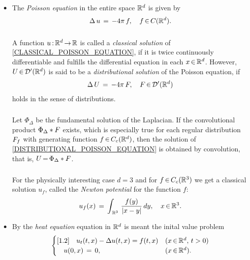 \documentclass[11pt,twoside]{article}
\begin{document}
\begin{itemize}[leftmargin=4mm]
\item[1.]
The \textit{Poisson equation} in the entire space ${\mathbb{R}}^d$ is given by
\begin{equation}\label{CLASSICAL_POISSON_EQUATION}
\Delta \, u \,=\, - 4\pi \,f, \quad f {\,\in\,} C({\mathbb{R}}^d).
\end{equation}

\subparagraph{} %
A function $u {\,:\,}{\mathbb{R}}^d {\,\to\,} {\mathbb{R}}$ is called a \textit{classical solution}
of \eqref{CLASSICAL_POISSON_EQUATION},
if it is twice continuously differentiable
and fulfills the differential equation in each $x {\,\in\,} {\mathbb{R}}^d$.
However,
$U {\,\in\,} {\mathcal{D}}'({\mathbb{R}}^d)$ is said to be a \textit{distributional solution}
of the Poisson equation,
if
\begin{equation}\label{DISTRIBUTIONAL_POISSON_EQUATION}
\Delta \, U \,=\, - 4\pi \,F, \quad F {\,\in\,} {\mathcal{D}}'({\mathbb{R}}^d)
\end{equation}
holds in the sense of distributions.

\subparagraph{}
Let $\Phi_{\Delta}$ be the fundamental solution of the Laplacian.
If the convolutional product $\Phi_{\Delta} \ast F$ exists,
which is especially true for each regular distribution $F_f$
with generating function $f {\,\in\,} C_c({\mathbb{R}}^d)$,
then the solution of \eqref{DISTRIBUTIONAL_POISSON_EQUATION}
is obtained by convolution,
that is,
$U {\,=\,} \Phi_{\Delta} \ast F$.

\subparagraph{}
For the physically interesting case $d=3$
and for $f {\,\in\,} C_c({\mathbb{R}}^3)$ we get a classical solution $u_f$,
called the \textit{Newton potential} for the function $f$:
\[
u_f(x) \=
\int_{\,\R^3} \, \frac{f(y)}{\abs{x-y } }  \, dy, \quad x \xeof \R^3.
\]

\item[2.]
By the \textit{heat equation} equation in ${\mathbb{R}}^d$ is meant
the inital value problem
\begin{equation}\label{CLASSICAL_HEAT_EQUATION}
\begin{cases}[1.2]
\quad u_t(t,x) - \Delta u(t,x) = f(t,x) & (x {\,\in\,} {\mathbb{R}}^d, \, t > 0) \\
\quad u(0,x) \,=\, 0,                      & (x {\,\in\,} {\mathbb{R}}^d). \\
\end{cases}
\end{equation}


\end{itemize}
\end{document}
